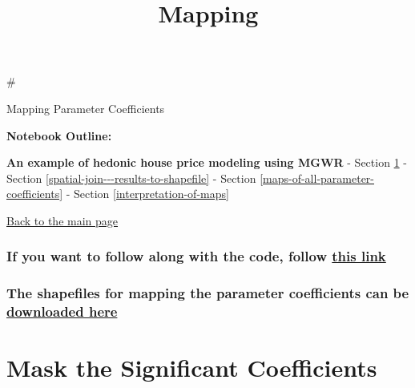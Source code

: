 \documentclass[11pt]{article}
\title{Mapping}
\begin{document}
    
    
    \maketitle
    
    

    
    \#

Mapping Parameter Coefficients

\textbf{Notebook Outline:}

\textbf{An example of hedonic house price modeling using MGWR} -
Section \ref{mask-the-significant-coefficients} -
Section \ref{spatial-join---results-to-shapefile} -
Section \ref{maps-of-all-parameter-coefficients} -
Section \ref{interpretation-of-maps}

\href{https://mehak-sachdeva.github.io/MGWR_workshop_book/}{Back to the
main page}

    \subsubsection{\texorpdfstring{If you want to follow along with the
code, follow
\href{https://colab.research.google.com/drive/1oqnwg_HkY-L_MdRTT2qg5EL-LRrOzmbd?usp=sharing}{this
link}}{If you want to follow along with the code, follow this link}}\label{if-you-want-to-follow-along-with-the-code-follow-this-link}

\subsubsection{\texorpdfstring{The shapefiles for mapping the parameter
coefficients can be
\href{https://github.com/mehak-sachdeva/MGWR_Workshop_2020/archive/master.zip}{downloaded
here}}{The shapefiles for mapping the parameter coefficients can be downloaded here}}\label{the-shapefiles-for-mapping-the-parameter-coefficients-can-be-downloaded-here}

    \section{Mask the Significant
Coefficients}\label{mask-the-significant-coefficients}
\end{document}
